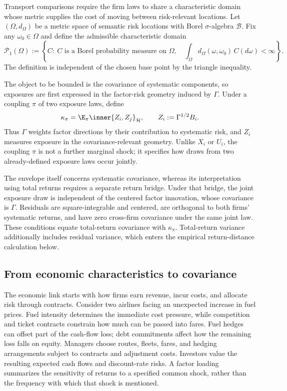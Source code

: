 Transport comparisons require the firm laws to share a characteristic domain
whose metric supplies the cost of moving between risk-relevant locations.
Let $(\Omega,d_\Omega)$ be a metric space of semantic risk locations with
Borel $\sigma$-algebra $\mathcal B$.
Fix any $\omega_0\in\Omega$ and define the admissible characteristic domain
\begin{equation}\label{eq:characteristic-domain}
  \mathcal P_1(\Omega)
  :=\left\{C:\ C\text{ is a Borel probability measure on }\Omega,\quad
  \int_\Omega d_\Omega(\omega,\omega_0)\,C(d\omega)<\infty\right\}.
\end{equation}
The definition is independent of the chosen base point by the triangle inequality.

The object to be bounded is the covariance of systematic components, so
exposures are first expressed in the factor-risk geometry induced by $\Gamma$.
Under a coupling $\pi$ of two exposure laws, define
\begin{equation}\label{eq:hilbert-systematic-covariance}
  \kappa_\pi=\E_\pi\inner{Z_i,Z_j}_{\mathcal H},
  \qquad Z_i:=\Gamma^{1/2}B_i.
\end{equation}
Thus $\Gamma$ weights factor directions by their contribution to systematic
risk, and $Z_i$ measures exposure in the covariance-relevant geometry.
Unlike $X_i$ or $U_i$, the coupling $\pi$ is not a further marginal shock; it
specifies how draws from two already-defined exposure laws occur jointly.

The envelope itself concerns systematic covariance, whereas its
interpretation using total returns requires a separate return bridge.
Under that bridge, the joint exposure draw is independent of the centered
factor innovation, whose covariance is $\Gamma$.
Residuals are square-integrable and centered, are orthogonal to both firms'
systematic returns, and have zero cross-firm covariance under the same joint law.
These conditions equate total-return covariance with $\kappa_\pi$.
Total-return variance additionally includes residual variance, which enters
the empirical return-distance calculation below.

\subsection{From economic characteristics to covariance}\label{sec:random-exposure}

The economic link starts with how firms earn revenue, incur costs, and
allocate risk through contracts.
Consider two airlines facing an unexpected increase in fuel prices.
Fuel intensity determines the immediate cost pressure, while competition and
ticket contracts constrain how much can be passed into fares.
Fuel hedges can offset part of the cash-flow loss; debt commitments affect
how the remaining loss falls on equity.
Managers choose routes, fleets, fares, and hedging arrangements subject to
contracts and adjustment costs.
Investors value the resulting expected cash flows and discount-rate risks.
A factor loading summarizes the sensitivity of returns to a specified
common shock, rather than the frequency with which that shock is mentioned.

